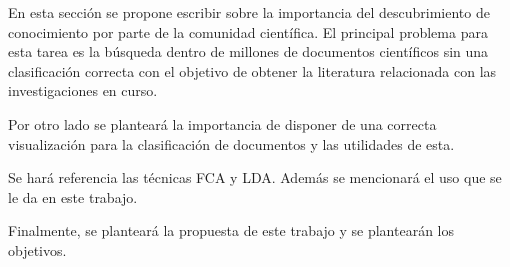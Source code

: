 En esta sección se propone escribir sobre la importancia del descubrimiento de conocimiento por parte de la comunidad científica. El principal problema para esta tarea es la búsqueda dentro de millones de documentos científicos sin una clasificación correcta con el objetivo de obtener la literatura relacionada con las investigaciones en curso. 

Por otro lado se planteará la importancia de disponer de una correcta visualización para la clasificación de documentos y las utilidades de esta.

Se hará referencia las técnicas FCA y LDA. Además se mencionará el uso que se le da en este trabajo.

Finalmente, se planteará la propuesta de este trabajo y se plantearán los objetivos.
